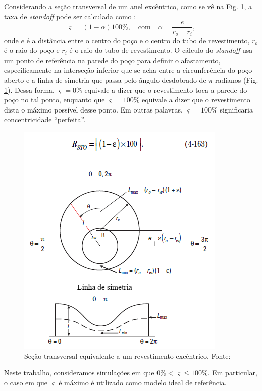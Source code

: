 Considerando a seção transversal de um anel excêntrico, como se vê na Fig. \ref{fig:secao_transversal_equivalente_livro}, a taxa de \textit{standoff} pode ser calculada como \cite{Erik}: 
\begin{equation}
    \varsigma = (1 - \alpha) 100\%, \quad \text{com} \quad \alpha = \frac{e}{r_o - r_i},
\end{equation}
onde $e$ é a distância entre o centro do poço e o centro do tubo de revestimento, $r_o$ é o raio do poço e $r_i$ é o raio do tubo de revestimento. O cálculo do \textit{standoff} usa um ponto de referência na parede do poço para definir o afastamento, especificamente na interseção inferior que se acha entre a circunferência do poço aberto e a linha de simetria que passa pelo ângulo desdobrado de $\pi$ radianos (Fig. \ref{fig:secao_transversal_equivalente_livro}). Dessa forma, $\varsigma = 0\%$ equivale a dizer que o revestimento toca a parede do poço no tal ponto, enquanto que $\varsigma = 100\%$ equivale a dizer que o revestimento dista o máximo possível desse ponto. Em outras palavras, $\varsigma = 100\%$ significaria concentricidade ``perfeita''.
\begin{figure}[H]
	\centering
	\includegraphics[width=0.75\linewidth]{img/Standoff_livro_Well.png}
	\caption{Seção transversal equivalente a um revestimento excêntrico. Fonte: \cite{Erik}}
	\label{fig:secao_transversal_equivalente_livro}
\end{figure}
Neste trabalho, consideramos simulações em que $0\% < \varsigma \leq 100\%$. Em particular, o caso em que $\varsigma$ é máximo é utilizado como modelo ideal de referência.

